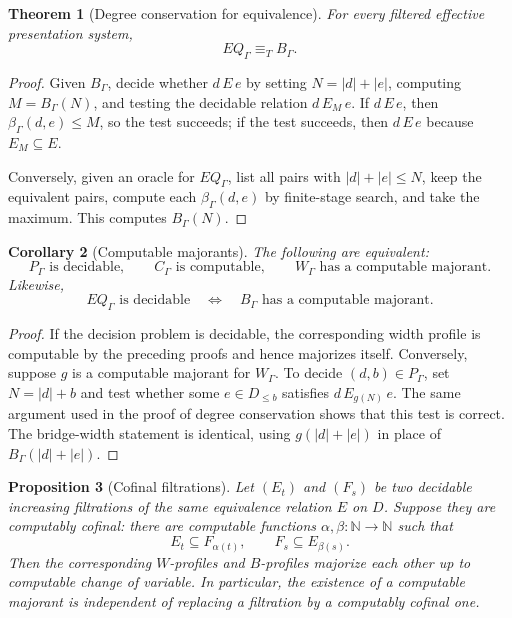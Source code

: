 \documentclass[11pt]{article}
\newtheorem{theorem}{Theorem}[section]
\newtheorem{proposition}[theorem]{Proposition}
\newtheorem{corollary}[theorem]{Corollary}
\begin{document}
\begin{theorem}[Degree conservation for equivalence]
For every filtered effective presentation system,
\[
EQ_\Gamma\equiv_T B_\Gamma.
\]
\end{theorem}

\begin{proof}
Given \(B_\Gamma\), decide whether \(d\,E\,e\) by setting \(N=|d|+|e|\), computing \(M=B_\Gamma(N)\), and testing the decidable relation \(d\,E_M\,e\).  If \(d\,E\,e\), then \(\beta_\Gamma(d,e)\leq M\), so the test succeeds; if the test succeeds, then \(d\,E\,e\) because \(E_M\subseteq E\).

Conversely, given an oracle for \(EQ_\Gamma\), list all pairs with \(|d|+|e|\leq N\), keep the equivalent pairs, compute each \(\beta_\Gamma(d,e)\) by finite-stage search, and take the maximum.  This computes \(B_\Gamma(N)\).
\end{proof}

\begin{corollary}[Computable majorants]
The following are equivalent:
\[
P_\Gamma\text{ is decidable},\qquad
C_\Gamma\text{ is computable},\qquad
W_\Gamma\text{ has a computable majorant}.
\]
Likewise,
\[
EQ_\Gamma\text{ is decidable}
\quad\Longleftrightarrow\quad
B_\Gamma\text{ has a computable majorant}.
\]
\end{corollary}

\begin{proof}
If the decision problem is decidable, the corresponding width profile is computable by the preceding proofs and hence majorizes itself.  Conversely, suppose \(g\) is a computable majorant for \(W_\Gamma\).  To decide \((d,b)\in P_\Gamma\), set \(N=|d|+b\) and test whether some \(e\in D_{\leq b}\) satisfies \(d\,E_{g(N)}\,e\).  The same argument used in the proof of degree conservation shows that this test is correct.  The bridge-width statement is identical, using \(g(|d|+|e|)\) in place of \(B_\Gamma(|d|+|e|)\).
\end{proof}

\begin{proposition}[Cofinal filtrations]
Let \((E_t)\) and \((F_s)\) be two decidable increasing filtrations of the same equivalence relation \(E\) on \(D\).  Suppose they are computably cofinal: there are computable functions \(\alpha,\beta:\mathbb N\to\mathbb N\) such that
\[
E_t\subseteq F_{\alpha(t)},\qquad F_s\subseteq E_{\beta(s)}.
\]
Then the corresponding \(W\)-profiles and \(B\)-profiles majorize each other up to computable change of variable.  In particular, the existence of a computable majorant is independent of replacing a filtration by a computably cofinal one.
\end{proposition}
\end{document}
